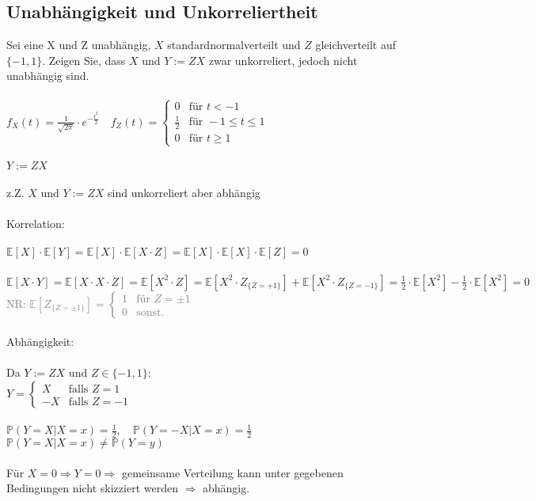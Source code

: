 \documentclass[a4paper]{article}
\begin{document}
\subsection{Unabhängigkeit und Unkorreliertheit}
Sei eine X und Z unabhängig, $X$ standardnormalverteilt und $Z$ gleichverteilt auf $\{-1, 1\}$. Zeigen Sie, dass $X$ und $Y := ZX$ zwar unkorreliert, jedoch nicht unabhängig sind.\\\\
\(f_X(t)=\frac{1}{\sqrt{2\pi}}\cdot e^{-\frac{t^2}{2}} \quad f_Z(t)=
\begin{cases}
    0 & \text{für }t<-1\\
    \frac{1}{2} & \text{für } -1\leq t \leq 1\\
    0 & \text{für } t\geq 1
\end{cases}\)\\\\
\(Y:=ZX\)\\\\
z.Z. $X$ und $Y:=ZX$ sind unkorreliert aber abhängig\\\\
Korrelation:\\\\
\(\mathbb{E}[X]\cdot \mathbb{E}[Y]=\mathbb{E}[X]\cdot \mathbb{E}[X\cdot Z]=\mathbb{E}[X]\cdot \mathbb{E}[X]\cdot \mathbb{E}[Z]=0\)\\\\
\(\mathbb{E}[X\cdot Y]=\mathbb{E}[X\cdot X \cdot Z]=\mathbb{E}[X^2\cdot Z]=\mathbb{E}[X^2\cdot Z_{\{Z=+1\}}]+\mathbb{E}[X^2\cdot Z_{\{Z=-1\}}]=\frac{1}{2}\cdot\mathbb{E}[X^2]-\frac{1}{2}\cdot \mathbb{E}[X^2]=0\)\\
\textcolor{gray}{NR: \(\mathbb{E}[Z_{\{Z=\pm 1\}}]=\begin{cases}
    1 & \text{für } Z=\pm 1\\
    0 & \text{sonst.}
\end{cases}\)}\\\\
Abhängigkeit:\\\\
Da $Y:=ZX$ und $Z\in \{-1,1\}:$\\
\(Y = \begin{cases}
    X & \text{falls } Z=1\\
    -X & \text{falls } Z=-1
\end{cases}\)\\\\
\(\mathbb{P}(Y=X\vert X=x)=\frac{1}{2}, \quad \mathbb{P}(Y=-X\vert X=x)=\frac{1}{2}\)\\
\(\mathbb{P}(Y=X\vert X=x) \neq \mathbb{P}(Y=y)\)\\\\
Für \(X=0\Rightarrow Y=0 \Rightarrow \) gemeinsame Verteilung kann unter gegebenen Bedingungen nicht skizziert werden $\Rightarrow$ abhängig.
\end{document}
